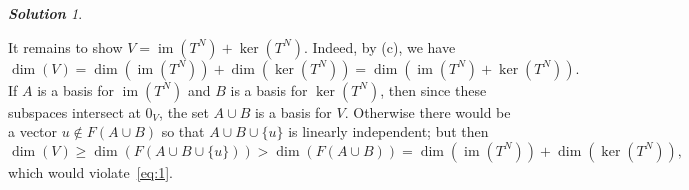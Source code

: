 \documentclass[11pt]{paper}
\theoremstyle{remark}
\newtheorem*{solution}{{\bf Solution}}
\newcommand\0{\ensuremath{\mathbf{0}}}
\newcommand{\<}{\ensuremath{\langle}}
\renewcommand{\>}{\ensuremath{\rangle}}
\renewcommand{\ker}[1]{\ensuremath{\operatorname{ker}(#1)}}
\renewcommand{\dim}[1]{\ensuremath{\operatorname{dim}(#1)}}
\newcommand\im[1]{\ensuremath{\operatorname{im}(#1)}}
\renewcommand{\geq}{\ensuremath{\geqslant}}
\begin{document}
\begin{solution}
\begin{enumerate}[(a)]
It remains to show $V = \im{T^N} +
\ker{T^N}$. Indeed, by (c), we have 
\begin{equation}
  \label{eq:1}
\dim{V} = \dim{\im{T^N}} +\dim{\ker{T^N}} = \dim{\im{T^N} + \ker{T^N}}.
\end{equation}
If $A$ is a basis for $\im{T^N}$ and $B$ is a basis for $\ker{T^N}$, then since
these subspaces intersect at $0_V$, the set $A\cup B$ is a basis for
$V$. Otherwise there would be a vector $u\notin F(A\cup B)$ so that
$A\cup B \cup\{u\}$ is linearly independent; but then
\[
\dim{V} \geq \dim{F(A\cup B \cup\{u\})} > \dim{F(A\cup B)} =
 \dim{\im{T^N}} +\dim{\ker{T^N}},
\]
which would violate~\ref{eq:1}.

  \end{enumerate}
\end{solution}
\probskip
\end{document}

